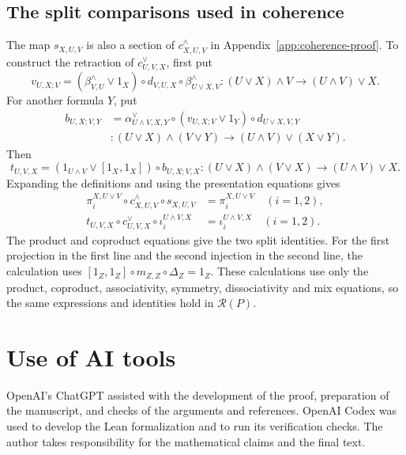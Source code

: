 \documentclass[11pt]{article}
\begin{document}
\subsection{The split comparisons used in coherence}

The map $s_{X,U,V}$ is also a section of $c^\wedge_{X,U,V}$ in
Appendix~\ref{app:coherence-proof}. To construct the retraction
of $c^\vee_{U,V,X}$, first put
\[
 v_{U,X;V}=(\beta^\wedge_{V,U}\vee1_X)\circ d_{V,U,X}
                \circ\beta^\wedge_{U\vee X,V}:
 (U\vee X)\wedge V\longrightarrow(U\wedge V)\vee X.
\]
For another formula $Y$, put
\[
 \begin{aligned}
 b_{U,X;V,Y}
 &=\alpha^\vee_{U\wedge V,X,Y}\circ(v_{U,X;V}\vee1_Y)
                      \circ d_{U\vee X,V,Y}\\
 &:(U\vee X)\wedge(V\vee Y)
                   \longrightarrow(U\wedge V)\vee(X\vee Y).
 \end{aligned}
\]
Then
\[
 t_{U,V,X}=(1_{U\wedge V}\vee[1_X,1_X])\circ b_{U,X;V,X}:
 (U\vee X)\wedge(V\vee X)\longrightarrow(U\wedge V)\vee X.
\]
Expanding the definitions and using the presentation equations
gives
\[
 \begin{aligned}
 \pi_i^{X,U\vee V}\circ c^\wedge_{X,U,V}\circ s_{X,U,V}
     &=\pi_i^{X,U\vee V}\quad(i=1,2),\\
 t_{U,V,X}\circ c^\vee_{U,V,X}\circ\iota_i^{U\wedge V,X}
     &=\iota_i^{U\wedge V,X}\quad(i=1,2).
 \end{aligned}
\]
The product and coproduct equations give the two split identities.
For the first projection in the first line and the second injection
in the second line, the calculation uses
$[1_Z,1_Z]\circ m_{Z,Z}\circ\Delta_Z=1_Z$.
These calculations use only the product, coproduct, associativity,
symmetry, dissociativity and mix equations, so the same expressions
and identities hold in $\mathcal R(P)$.

\section*{Use of AI tools}
OpenAI's ChatGPT assisted with the development of the proof, preparation
of the manuscript, and checks of the arguments and references. OpenAI Codex
was used to develop the Lean formalization and to run its verification
checks. The author takes responsibility for the mathematical claims and
the final text.

\clearpage
\begingroup
\small
\setlength{\bibsep}{2pt}


\endgroup
\end{document}
